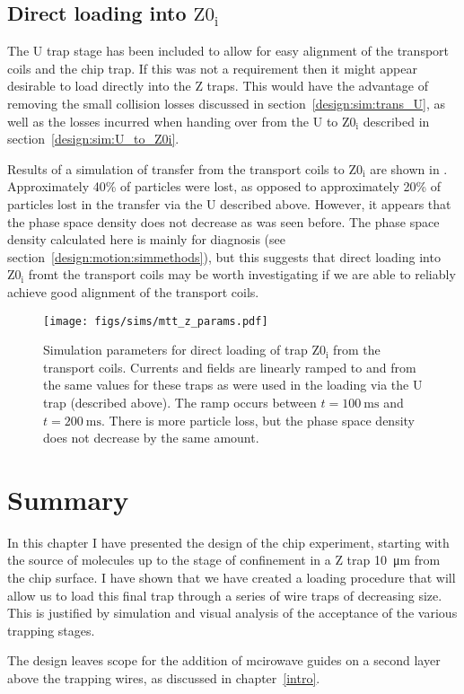 \subsection{Direct loading into $\mathrm{Z0_i}$}

The U trap stage has been included to allow for easy alignment of the transport
coils and the chip trap. If this was not a requirement then it might appear
desirable to load directly into the Z traps. This would have the advantage of
removing the small collision losses discussed in
section~\ref{design:sim:trans_U}, as well as the losses incurred when handing
over from the U to $\mathrm{Z0_i}$ described in
section~\ref{design:sim:U_to_Z0i}.

Results of a simulation of transfer from the transport coils to $\mathrm{Z0_i}$
are shown in .  Approximately 40\% of
particles were lost, as opposed to approximately 20\% of particles lost in the
transfer via the U described above.  However, it appears that the phase space
density does not decrease as was seen before. The phase space density
calculated here is mainly for diagnosis (see section~\ref{design:motion:simmethods}),
but this suggests that direct loading into $\mathrm{Z0_i}$ fromt the transport
coils may be worth investigating if we are able to reliably achieve good
alignment of the transport coils. 

\begin{figure}[tbh]
\centering
  \texttt{[image: figs/sims/mtt\_z\_params.pdf]}
  \caption{
    Simulation parameters for direct loading of trap $\mathrm{Z0_i}$ from the
    transport coils. Currents and fields are linearly ramped to and from the
    same values for these traps as were used in the loading via the U trap
    (described above). The ramp occurs between $t=\SI{100}{\milli\second}$ and
    $t=\SI{200}{\milli\second}$. There is more particle loss, but the phase
    space density does not decrease by the same amount.
  }
  \label{design:fig:directzramp}
\end{figure}

\section{Summary}

In this chapter I have presented the design of the chip experiment, starting
with the source of molecules up to the stage of confinement in a Z trap
\SI{10}{\micro\meter} from the chip surface. I have shown that we have created
a loading procedure that will allow us to load this final trap through a series
of wire traps of decreasing size. This is justified by simulation and visual
analysis of the acceptance of the various trapping stages.

The design leaves scope for the addition of mcirowave guides on a second layer
above the trapping wires, as discussed in chapter~\ref{intro}.
